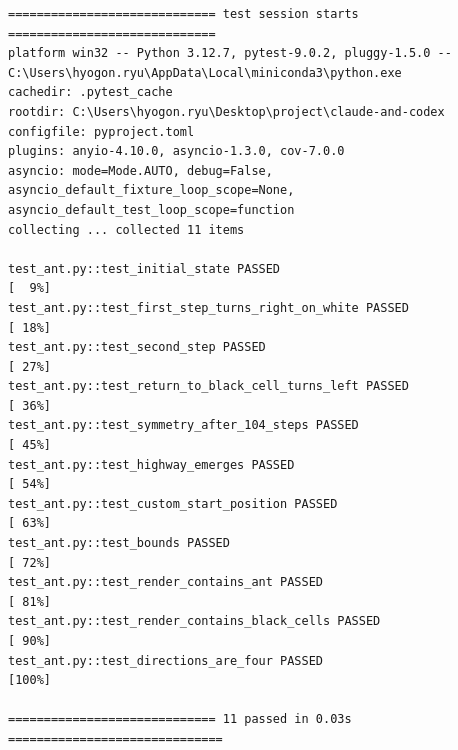 \documentclass[11pt,a4paper]{article}
\begin{document}
\begin{lstlisting}
============================= test session starts =============================
platform win32 -- Python 3.12.7, pytest-9.0.2, pluggy-1.5.0 -- C:\Users\hyogon.ryu\AppData\Local\miniconda3\python.exe
cachedir: .pytest_cache
rootdir: C:\Users\hyogon.ryu\Desktop\project\claude-and-codex
configfile: pyproject.toml
plugins: anyio-4.10.0, asyncio-1.3.0, cov-7.0.0
asyncio: mode=Mode.AUTO, debug=False, asyncio_default_fixture_loop_scope=None, asyncio_default_test_loop_scope=function
collecting ... collected 11 items

test_ant.py::test_initial_state PASSED                                   [  9%]
test_ant.py::test_first_step_turns_right_on_white PASSED                 [ 18%]
test_ant.py::test_second_step PASSED                                     [ 27%]
test_ant.py::test_return_to_black_cell_turns_left PASSED                 [ 36%]
test_ant.py::test_symmetry_after_104_steps PASSED                        [ 45%]
test_ant.py::test_highway_emerges PASSED                                 [ 54%]
test_ant.py::test_custom_start_position PASSED                           [ 63%]
test_ant.py::test_bounds PASSED                                          [ 72%]
test_ant.py::test_render_contains_ant PASSED                             [ 81%]
test_ant.py::test_render_contains_black_cells PASSED                     [ 90%]
test_ant.py::test_directions_are_four PASSED                             [100%]

============================= 11 passed in 0.03s ==============================
\end{lstlisting}
\end{document}
